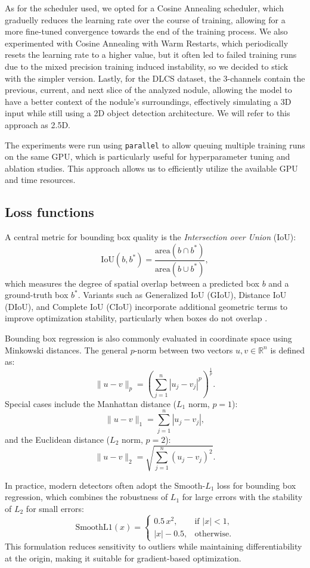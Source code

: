 As for the scheduler used, we opted for a Cosine Annealing scheduler, which graduelly reduces the learning rate over the course of training, allowing for a more fine-tuned convergence towards the end of the training process. We also experimented with Cosine Annealing with Warm Restarts, which periodically resets the learning rate to a higher value, but it often led to failed training runs due to the mixed precision training induced instability, so we decided to stick with the simpler version.
Lastly, for the DLCS dataset, the 3-channels contain the previous, current, and next slice of the analyzed nodule, allowing the model to have a better context of the nodule's surroundings, effectively simulating a 3D input while still using a 2D object detection architecture. We will refer to this approach as 2.5D.

The experiments were run using \texttt{parallel} to allow queuing multiple training runs on the same GPU, which is particularly useful for hyperparameter tuning and ablation studies. This approach allows us to efficiently utilize the available GPU and time resources.



\subsection{Loss functions}
\label{sec:loss_functions}
A central metric for bounding box quality is the \textit{Intersection over Union} (IoU):
$$
\mathrm{IoU}(b, b^\ast) = \frac{\mathrm{area}(b \cap b^\ast)}{\mathrm{area}(b \cup b^\ast)},
$$
which measures the degree of spatial overlap between a predicted box $b$ and a ground-truth box $b^\ast$.
Variants such as Generalized IoU (GIoU), Distance IoU (DIoU), and Complete IoU (CIoU) incorporate additional geometric terms to improve optimization stability, particularly when boxes do not overlap \cite{rezatofighi2019giou,zheng2019diou, zheng2021ciou}.


Bounding box regression is also commonly evaluated in coordinate space using Minkowski distances.
The general $p$-norm between two vectors $u,v \in \mathbb{R}^n$ is defined as:
$$
\| u - v \|_p = \left( \sum_{j=1}^n |u_j - v_j|^p \right)^{\frac{1}{p}}.
$$
Special cases include the Manhattan distance ($L_1$ norm, $p=1$):
$$
\| u - v \|_1 = \sum_{j=1}^n |u_j - v_j|,
$$
and the Euclidean distance ($L_2$ norm, $p=2$):
$$
\| u - v \|_2 = \sqrt{\sum_{j=1}^n (u_j - v_j)^2}.
$$

In practice, modern detectors often adopt the Smooth-$L_1$ loss \cite{girshick2015fastrcnn} for bounding box regression, which combines the robustness of $L_1$ for large errors with the stability of $L_2$ for small errors:
$$
\mathrm{SmoothL1}(x) =
\begin{cases}
0.5\,x^2, & \text{if } |x| < 1, \\
|x| - 0.5, & \text{otherwise}.
\end{cases}
$$
This formulation reduces sensitivity to outliers while maintaining differentiability at the origin, making it suitable for gradient-based optimization.

